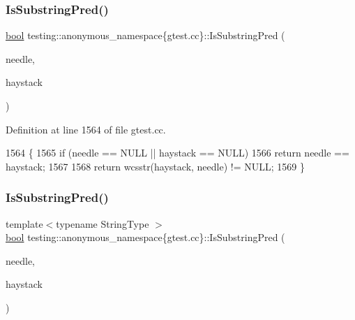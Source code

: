 \subsubsection{\texorpdfstring{Is\+Substring\+Pred()}{IsSubstringPred()}\hspace{0.1cm}{\footnotesize\ttfamily [2/3]}}
{\footnotesize\ttfamily \hyperlink{classbool}{bool} testing\+::anonymous\+\_\+namespace\{gtest.\+cc\}\+::Is\+Substring\+Pred (\begin{DoxyParamCaption}\item[{const wchar\+\_\+t $\ast$}]{needle,  }\item[{const wchar\+\_\+t $\ast$}]{haystack }\end{DoxyParamCaption})}



Definition at line 1564 of file gtest.\+cc.


\begin{DoxyCode}
1564                                                                      \{
1565   \textcolor{keywordflow}{if} (needle == NULL || haystack == NULL)
1566     \textcolor{keywordflow}{return} needle == haystack;
1567 
1568   \textcolor{keywordflow}{return} wcsstr(haystack, needle) != NULL;
1569 \}
\end{DoxyCode}
\mbox{\label{namespacetesting_1_1anonymous__namespace_02gtest_8cc_03_a529b2b4b07a1d3085fc3ee11f65e6b0c}} 
\subsubsection{\texorpdfstring{Is\+Substring\+Pred()}{IsSubstringPred()}\hspace{0.1cm}{\footnotesize\ttfamily [3/3]}}
{\footnotesize\ttfamily template$<$typename String\+Type $>$ \\
\hyperlink{classbool}{bool} testing\+::anonymous\+\_\+namespace\{gtest.\+cc\}\+::Is\+Substring\+Pred (\begin{DoxyParamCaption}\item[{const String\+Type \&}]{needle,  }\item[{const String\+Type \&}]{haystack }\end{DoxyParamCaption})}



